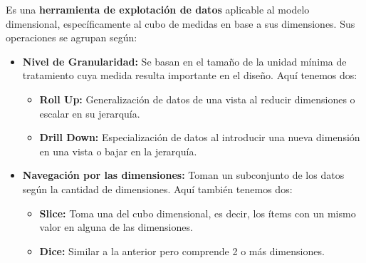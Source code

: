 Es una \textbf{herramienta de explotación de datos} aplicable al modelo dimensional, específicamente al cubo de medidas en base a sus dimensiones. Sus operaciones se agrupan según:
\begin{itemize}
    \item \textbf{Nivel de Granularidad:} Se basan en el tamaño de la unidad mínima de tratamiento cuya medida resulta importante en el diseño. Aquí tenemos dos:
    \begin{itemize}
        \item \textbf{Roll Up:} Generalización de datos de una vista al reducir dimensiones o escalar en su jerarquía.
        \item \textbf{Drill Down:} Especialización de datos al introducir una nueva dimensión en una vista o bajar en la jerarquía.
    \end{itemize}
    \item \textbf{Navegación por las dimensiones:} Toman un subconjunto de los datos según la cantidad de dimensiones. Aquí también tenemos dos:
    \begin{itemize}
        \item \textbf{Slice:} Toma una  del cubo dimensional, es decir, los ítems con un mismo valor en alguna de las dimensiones.
        \item \textbf{Dice:} Similar a la anterior pero comprende 2 o más dimensiones.
    \end{itemize}
\end{itemize}
